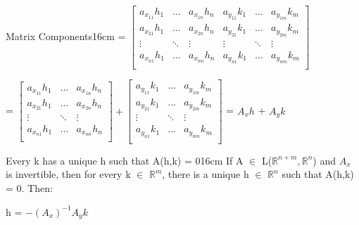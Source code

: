 \begin{definition}{Matrix Components}{16cm}
        \hspace{0.9cm}
        =
        $\begin{bmatrix}
            a_{x_{11}}h_1 & ... & a_{x_{1n}}h_n
                & a_{y_{11}}k_1 & ... & a_{y_{1m}}k_m \\
            a_{x_{21}}h_1 & ... & a_{x_{2n}}h_n
                & a_{y_{21}}k_1 & ... & a_{y_{2m}}k_m \\
            \vdots & \ddots & \vdots & \vdots & \ddots & \vdots \\
            a_{x_{n1}}h_1 & ... & a_{x_{nn}}h_n
                & a_{y_{n1}}k_1 & ... & a_{y_{nm}}k_m \\
        \end{bmatrix}$

        \hspace{0.9cm}
        =
        $\begin{bmatrix}
            a_{x_{11}}h_1 & ... & a_{x_{1n}}h_n \\
            a_{x_{21}}h_1 & ... & a_{x_{2n}}h_n \\
            \vdots & \ddots & \vdots \\
            a_{x_{n1}}h_1 & ... & a_{x_{nn}}h_n \\
        \end{bmatrix}
        +
        \begin{bmatrix}
            a_{y_{11}}k_1 & ... & a_{y_{1m}}k_m \\
            a_{y_{21}}k_1 & ... & a_{y_{2m}}k_m \\
            \vdots & \ddots & \vdots \\
            a_{y_{n1}}k_1 & ... & a_{y_{nm}}k_m \\
        \end{bmatrix}$
        = $A_xh$ + $A_yk$
    \end{definition}

    \newpage



    \begin{wtheorem}{Every k has a unique h such that A(h,k) = 0}{16cm}
        If A $\in$ L($\mathbb{R}^{n+m},\mathbb{R}^n$)
        and $A_x$ is invertible, then for every k $\in$ $\mathbb{R}^m$,
        there is a unique h $\in$ $\mathbb{R}^n$ such that A(h,k) = 0. Then:

        \hspace{0.5cm}
        h = $-(A_x)^{-1}A_yk$
    \end{wtheorem}

